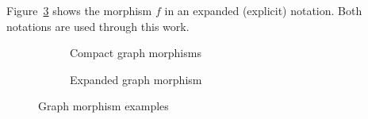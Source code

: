 \begin{example}
  Figure~\ref{fig:gts:expanded-graph-morphism} shows the morphism $f$ in an expanded (explicit) notation. Both notations are used through this work.
\begin{figure}[!ht]
  \centering
  \begin{subfigure}[t]{.5\textwidth}
    \centerline{}
  \caption{Compact graph morphisms}\label{fig:gts:compact-graph-morphism}
\end{subfigure}%
\begin{subfigure}[t]{.5\textwidth}
  \centerline{}
  \caption{Expanded graph morphism}\label{fig:gts:expanded-graph-morphism}
  \end{subfigure}
  \caption{Graph morphism examples}
\end{figure}

\end{example}

